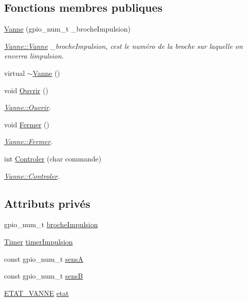 \subsection*{Fonctions membres publiques}
\begin{DoxyCompactItemize}
\item 
\hyperlink{class_vanne_aa809c804e63bec235b0733091217bdd5}{Vanne} (gpio\+\_\+num\+\_\+t \+\_\+broche\+Impulsion)
\begin{DoxyCompactList}\small\item\em \hyperlink{class_vanne_aa809c804e63bec235b0733091217bdd5}{Vanne\+::\+Vanne}  \+\_\+broche\+Impulsion, c\textquotesingle{}est le numéro de la broche sur laquelle on enverra l\textquotesingle{}impulsion. \end{DoxyCompactList}\item 
virtual \hyperlink{class_vanne_a682923104515512c227d3a91c5f156ed}{$\sim$\+Vanne} ()
\item 
void \hyperlink{class_vanne_abaf4f1253b0fb8016b86280017a5fd53}{Ouvrir} ()
\begin{DoxyCompactList}\small\item\em \hyperlink{class_vanne_abaf4f1253b0fb8016b86280017a5fd53}{Vanne\+::\+Ouvrir}. \end{DoxyCompactList}\item 
void \hyperlink{class_vanne_a009f9021ff1f44fa633eee3e8f42bd9f}{Fermer} ()
\begin{DoxyCompactList}\small\item\em \hyperlink{class_vanne_a009f9021ff1f44fa633eee3e8f42bd9f}{Vanne\+::\+Fermer}. \end{DoxyCompactList}\item 
int \hyperlink{class_vanne_a81820af5e718ed19bb3d7359484c8b88}{Controler} (char commande)
\begin{DoxyCompactList}\small\item\em \hyperlink{class_vanne_a81820af5e718ed19bb3d7359484c8b88}{Vanne\+::\+Controler}. \end{DoxyCompactList}\end{DoxyCompactItemize}
\subsection*{Attributs privés}
\begin{DoxyCompactItemize}
\item 
gpio\+\_\+num\+\_\+t \hyperlink{class_vanne_a972da53e393d5b1911b2c1bff2fc0cc7}{broche\+Impulsion}
\item 
\hyperlink{class_timer}{Timer} \hyperlink{class_vanne_a3cc616e595d81a083fe79dc1a5a74fa2}{timer\+Impulsion}
\item 
const gpio\+\_\+num\+\_\+t \hyperlink{class_vanne_ae5e8b2f4a69751a996ff535ff56c44bf}{sensA}
\item 
const gpio\+\_\+num\+\_\+t \hyperlink{class_vanne_ad50ee3497ec27d35b52b17531f0019b3}{sensB}
\item 
\hyperlink{class_vanne_a81379125f1e1526fbb5f07e234736a3f}{E\+T\+A\+T\+\_\+\+V\+A\+N\+NE} \hyperlink{class_vanne_aeb49318747b8a7cb8eeb3f9b9e6a3c71}{etat}
\end{DoxyCompactItemize}


